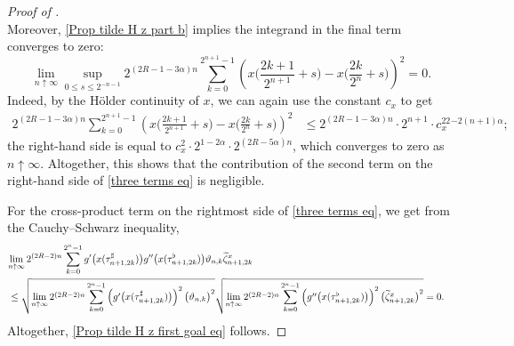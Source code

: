 \documentclass[10pt,a4paper]{amsart}
\def\ua{\uparrow}
\def\wt{\widetilde}
\begin{document}
\begin{proof}[Proof of ]
\begin{equation*}
	\end{equation*}
	Moreover, \ref{Prop tilde H z part b} implies the  integrand in the final term converges to zero:
	\begin{equation}\label{Prop tilde H z aux claim}
		\lim_{n\ua\infty}\sup_{0\le s\le 2^{-n-1}}2^{(2{R}-1-3\alpha)n}\sum_{k = 0}^{2^{n+1}-1}\left(x\Big(\frac{2k+1}{2^{n+1}}+s\Big)-x\Big(\frac{2k}{2^{n}}+s\Big)\right)^2=0.
	\end{equation}
	Indeed, by the H\"older continuity of $x$, we can again use the  constant $c_x$ to get 
	\begin{align*}
		2^{(2{R}-1-3\alpha)n}\sum_{k = 0}^{2^{n+1}-1}\left(x\Big(\frac{2k+1}{2^{n+1}}+s\Big)-x\Big(\frac{2k}{2^{n}}+s\Big)\right)^2&\le 2^{(2{R}-1-3\alpha)n}\cdot 2^{n+1}\cdot c_x^22^{-2(n+1)\alpha};
	\end{align*}
	the right-hand side is equal to $c_x^2\cdot2^{1-2\alpha}\cdot2^{(2{R}-5\alpha)n}$, which converges to zero as $n\ua\infty$. Altogether, this shows that the contribution of the second term on the right-hand side of \eqref{three terms eq} is negligible. 
	
	
	
	For the cross-product term on the rightmost side of \eqref{three terms eq}, we get from the Cauchy--Schwarz inequality, 
	\begin{equation*}
		\begin{split}
			\lefteqn{\lim_{n \ua \infty}2^{(2{R}-2)n}\sum_{k = 0}^{2^n-1}g'\big(x(\tau^\sharp_{n+1,2k})\big)g''\big(x(\tau^\flat_{n+1,2k})\big)\vartheta_{n,k}\wt\zeta^x_{n+1,2k}}
			\\&\le \sqrt{\lim_{n \ua \infty}2^{(2{R}-2)n}\sum_{k = 0}^{2^n-1}\left(g'\big(x(\tau^\sharp_{n+1,2k})\big)\right)^2\big(\vartheta_{n,k}\big)^2} \sqrt{\lim_{n \ua \infty}2^{(2{R}-2)n}\sum_{k = 0}^{2^n-1}\left(g''\big(x(\tau^\flat_{n+1,2k})\big)\right)^2\big(\wt\zeta^x_{n+1,2k}\big)^2} = 0.
		\end{split}
	\end{equation*}
	Altogether, \eqref{Prop tilde H z first goal eq} follows.\end{proof}
\end{document}
